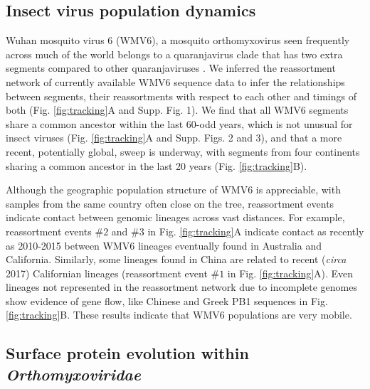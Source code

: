 \documentclass[11pt,twocolumn]{article}
\begin{document}
\subsection{Insect virus population dynamics}

Wuhan mosquito virus 6 (WMV6), a mosquito orthomyxovirus seen frequently across much of the world \citep{pettersson_meta-transcriptomic_2019,li_unprecedented_2015,shi_high-resolution_2017} belongs to a quaranjavirus clade that has two extra segments compared to other quaranjaviruses \citep{batson_single_2021}.
We inferred the reassortment network \citep{muller_bayesian_2020} of currently available WMV6 sequence data to infer the relationships between segments, their reassortments with respect to each other and timings of both (Fig. \ref{fig:tracking}A and Supp. Fig. 1).
We find that all WMV6 segments share a common ancestor within the last 60-odd years, which is not unusual for insect viruses \citep{webster_discovery_2015} (Fig. \ref{fig:tracking}A and Supp. Figs. 2 and 3), and that a more recent, potentially global, sweep is underway, with segments from four continents sharing a common ancestor in the last 20 years (Fig. \ref{fig:tracking}B).

Although the geographic population structure of WMV6 is appreciable, with samples from the same country often close on the tree, reassortment events indicate contact between genomic lineages across vast distances.
For example, reassortment events $\#2$ and $\#3$ in Fig. \ref{fig:tracking}A indicate contact as recently as 2010-2015 between WMV6 lineages eventually found in Australia and California.
Similarly, some lineages found in China are related to recent (\textit{circa} 2017) Californian lineages (reassortment event $\#1$ in Fig. \ref{fig:tracking}A).
Even lineages not represented in the reassortment network due to incomplete genomes show evidence of gene flow, like Chinese and Greek PB1 sequences in Fig. \ref{fig:tracking}B.
These results indicate that WMV6 populations are very mobile.

\subsection{Surface protein evolution within \textit{Orthomyxoviridae}}
\end{document}
